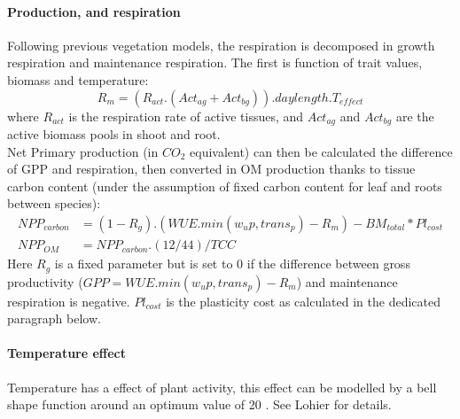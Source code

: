 \paragraph{Production, and respiration} Following previous vegetation models, the respiration is decomposed in growth respiration and maintenance respiration. The first is function of trait values, biomass and temperature:
\begin{equation}
R_{m} = \left(R_{act}.\left(Act_{ag} + Act_{bg}\right)\right) . daylength . T_{effect}
\end{equation}
where $R_{act}$ is the respiration rate of active tissues, and $Act_{ag}$ and $Act_{bg}$ are the active biomass pools in shoot and root.\\
\indent Net Primary production (in $CO_{2}$ equivalent) can then be calculated the difference of GPP and respiration, then converted in OM production thanks to tissue carbon content (under the assumption of fixed carbon content for leaf and roots between species):
 \begin{align}
 NPP_{carbon} &= (1- R_{g}) . (WUE . min(w_up, trans_p) - R_{m}) - BM_{total} * Pl_{cost}\\
 NPP_{OM} &= NPP_{carbon} . (12/44) / TCC
\end{align} 
Here $R_{g}$ is a fixed parameter but is set to $0$ if the difference between gross productivity ($GPP = WUE . min(w_up, trans_p) - R_{m}$) and maintenance respiration is negative. $Pl_{cost}$ is the plasticity cost as calculated in the dedicated paragraph below.

\paragraph{Temperature effect} Temperature has a effect of plant activity, this effect can be modelled by a bell shape function around an optimum value of 20 \celsius . See Lohier for details.


